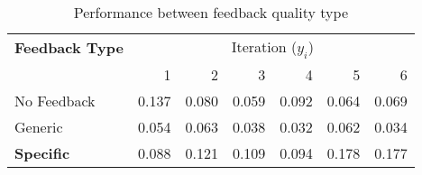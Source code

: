 \begin{table}[!h]
\caption{Performance between feedback quality type}
\label{tab:feedback_type}
\begin{tabular}{l|rrrrrr}
\toprule
\textbf{Feedback Type} & \multicolumn{6}{c}{Iteration ($y_{i}$)} \\
 & 1 & 2 & 3 & 4 & 5 & 6 \\
\midrule
No Feedback & 0.137 & 0.080 & 0.059 & 0.092 & 0.064 & 0.069 \\
Generic & 0.054 & 0.063 & 0.038 & 0.032 & 0.062 & 0.034 \\
\textbf{Specific} & 0.088 & 0.121 & 0.109 & 0.094 & 0.178 & 0.177 \\
\bottomrule
\end{tabular}
\end{table}
